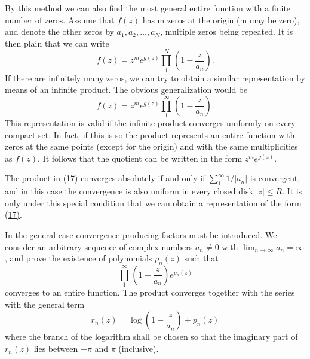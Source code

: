 By this method we can also find the most general entire function with a finite number of zeros. Assume that $f(z)$ has m zeros at the origin (m may be zero), and denote the other zeros by $a_{1}, a_{2}, \ldots, a_{N}$, multiple zeros being repeated. It is then plain that we can write
\begin{equation*}
f (z) = z ^ {m} e ^ {g (z)} \prod_ {1} ^ {N} \left(1 - \frac {z}{a _ {n}}\right).
\end{equation*}
If there are infinitely many zeros, we can try to obtain a similar representation by means of an infinite product. The obvious generalization would be
\begin{equation*}
f (z) = z ^ {m} e ^ {g (z)} \prod_ {1} ^ {\infty} \left(1 - \frac {z}{a _ {n}}\right).\tag{17}\label{eq:5.17}
\end{equation*}
This representation is valid if the infinite product converges uniformly on every compact set. In fact, if this is so the product represents an entire function with zeros at the same points (except for the origin) and with the same multiplicities as $f(z)$. It follows that the quotient can be written in the form $z^{m}e^{g(z)}$.

The product in \hyperref[eq:5.17]{(17)} converges absolutely if and only if $\sum_{1}^{\infty} 1 / |a_n|$ is convergent, and in this case the convergence is also uniform in every closed disk $|z| \leq R$. It is only under this special condition that we can obtain a representation of the form \hyperref[eq:5.17]{(17)}.

In the general case convergence-producing factors must be introduced. We consider an arbitrary sequence of complex numbers $a_{n} \neq 0$ with $\lim_{n \to \infty} a_{n} = \infty$, and prove the existence of polynomials $p_{n}(z)$ such that
\begin{equation*}
\prod_ {1} ^ {\infty} \left(1 - \frac {z}{a _ {n}}\right) e ^ {p _ {n} (z)}\tag{18}\label{eq:5.18}
\end{equation*}
converges to an entire function. The product converges together with the series with the general term
\begin{equation*}
r _ {n} (z) = \log \left(1 - \frac {z}{a _ {n}}\right) + p _ {n} (z)
\end{equation*}
where the branch of the logarithm shall be chosen so that the imaginary part of $r_{n}(z)$ lies between $-\pi$ and $\pi$ (inclusive).

